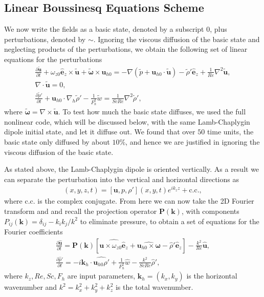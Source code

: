 \subsection{Linear Boussinesq Equations Scheme}
We now write the fields as a basic state, denoted by a subscript $0$, plus perturbations, denoted by $\sim$. Ignoring the viscous diffusion of the basic state \cite{drazinreid} and neglecting products of the perturbations, we obtain the following set of linear equations for the perturbations
\begin{align}
\frac{\partial \tilde{\bm{u}}}{\partial t} + \omega_{z0}\hat{\bm{e}}_{z}\times \tilde{\bm{u}}+\tilde{\boldsymbol{\omega}}\times \bm{u}_{h0} = -\nabla(\tilde{p}+\bm{u}_{h0} \cdot \tilde{\bm{u}}) - \tilde{\rho}'\hat{\bm{e}}_{z} + \frac{1}{Re}\nabla^{2}\tilde{\bm{u}},\label{nsl1}\\
\nabla\cdot\tilde{\bm{u}}=0,\\
\frac{\partial \tilde{\rho}'}{\partial t} + \bm{u}_{h0}\cdot \nabla_{h}\tilde{\rho}'-\frac{1}{F_{h}^{2}}\tilde{w} = \frac{1}{ScRe}\nabla^{2}\tilde{\rho}',\label{nsl3}
\end{align}
where $\tilde{\boldsymbol{\omega}}=\nabla \times \tilde{\bm{u}}$. To test how much the basic state diffuses, we used the full nonlinear code, which will be discussed below, with the same Lamb-Chaplygin dipole initial state, and let it diffuse out. We found that over $50$ time units, the basic state only diffused by about $10\%$, and hence we are justified in ignoring the viscous diffusion of the basic state. 

As stated above, the Lamb-Chaplygin dipole is oriented vertically. As a result we can separate the perturbation into the vertical and horizontal directions as 
\begin{align} 
[\tilde{\bm{u}},\tilde{p},\tilde{\rho}'](x,y,z,t) = [\bm{u},p,\rho'](x,y,t)e^{ik_{z}z} + \text{c.c.},
\end{align}
where c.c. is the complex conjugate. From here we can now take the 2D Fourier transform and and recall the projection operator $\textbf{P}(\textbf{k})$, with components $P_{ij}(\textbf{k})=\delta_{ij} - k_{i}k_{j}/k^{2}$ to eliminate pressure, to obtain a set of equations for the Fourier coefficients 
\begin{align}
\frac{\partial \hat{\bm{u}}}{\partial t} = \textbf{P}(\textbf{k})[\widehat{\bm{u}\times \omega_{z0}\hat{\bm{e}}_{z}} + \widehat{\bm{u}_{h0}\times\bm{\omega}}-\hat{\rho}'\hat{\bm{e}}_{z}] - \frac{k^{2}}{Re}\hat{\bm{u}},\label{solve1}\\
\frac{\partial\hat{\rho}'}{\partial t} = -i\bm{k}_{h}\cdot\widehat{\bm{u}_{h0}\rho'} + \frac{1}{F_{h}^{2}}\hat{w}- \frac{k^{2}}{ScRe}\hat{\rho}',\label{solve2}
\end{align}
where $k_{z},Re,Sc,F_{h}$ are input parameters, $\bm{k}_{h}=(k_{x},k_{y})$ is the horizontal wavenumber and $k^{2}=k_{x}^{2}+k_{y}^{2}+k_{z}^{2}$ is the total wavenumber. 

